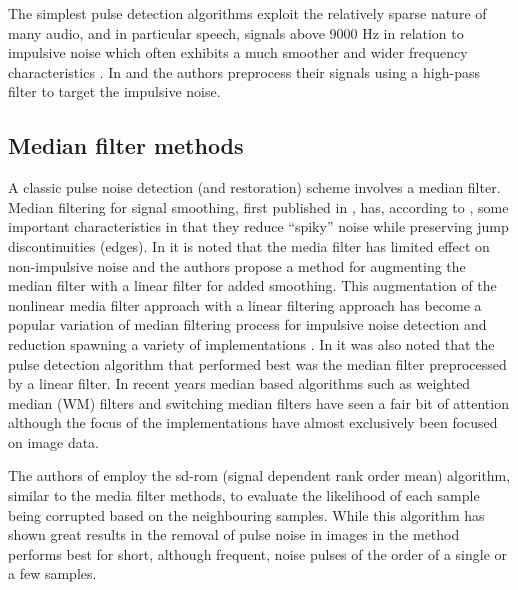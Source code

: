 The simplest pulse detection algorithms exploit the relatively sparse nature of many audio, and in particular speech, signals above 9000 Hz in relation to impulsive noise which often exhibits a much smoother and wider frequency characteristics \cite{Subramanya2007}. In \cite{Kasparis1993} and \cite{US6795559} the authors preprocess their signals using a high-pass filter to target the impulsive noise.

\subsection{Median filter methods}\label{sec:LitRevDetMedianFilts}
A classic pulse noise detection (and restoration) scheme involves a median filter\cite{Tukey1974}\linebreak[2]\cite{Lee1985}\cite{Heinonen1985}\cite{Heinonen1987}\cite{Maekivirta1991}\cite{Kasparis1993}.
Median filtering for signal smoothing, first published in \cite{Tukey1974}, has, according to \cite{Brillinger2002}, some important characteristics in that they reduce ``spiky'' noise while preserving jump discontinuities (edges). In \cite{Lee1985} it is noted that the media filter has limited effect on non-impulsive noise and the authors propose a method for augmenting the median filter with a linear filter for added smoothing. This augmentation of the nonlinear media filter approach with a linear filtering approach has become a popular variation of median filtering process for impulsive noise detection and reduction spawning a variety of implementations \cite{Lee1985}\cite{Heinonen1985}\cite{Nieminen1987}\cite{Kasparis1993}\cite{Loveridge1995}. In \cite{Kauppinen2002} it was also noted that the pulse detection algorithm that performed best was the median filter preprocessed by a linear filter. In recent years median based algorithms such as weighted median (WM) filters \cite{Yin1996}\cite{Wang2010} and switching median filters \cite{Abreu1996}\cite{Chen2000}\cite{Chen2001}\cite{Lin2007} have seen a fair bit of attention although the focus of the implementations have almost exclusively been focused on image data.

The authors of \cite{Chandra1998} employ the \gls{sd-rom} (signal dependent rank order mean) algorithm, similar to the media filter methods, to evaluate the likelihood of each sample being corrupted based on the neighbouring samples. While this algorithm has shown great results in the removal of pulse noise in images \cite{Abreu1996} in \cite{Chandra1998} the method performs best for short, although frequent, noise pulses of the order of a single or a few samples.

